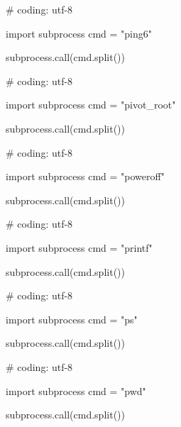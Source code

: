 \begin{mylisting}[label={lst:acpid},language=sh,caption=ping6]

# coding: utf-8

import subprocess
cmd = "ping6"

subprocess.call(cmd.split())

\end{mylisting}

\begin{mylisting}[label={lst:acpid},language=sh,caption=pivot_root]

# coding: utf-8

import subprocess
cmd = "pivot_root"

subprocess.call(cmd.split())

\end{mylisting}

\begin{mylisting}[label={lst:acpid},language=sh,caption=poweroff]

# coding: utf-8

import subprocess
cmd = "poweroff"

subprocess.call(cmd.split())

\end{mylisting}

\begin{mylisting}[label={lst:acpid},language=sh,caption=printf]

# coding: utf-8

import subprocess
cmd = "printf"

subprocess.call(cmd.split())

\end{mylisting}

\begin{mylisting}[label={lst:acpid},language=sh,caption=ps]

# coding: utf-8

import subprocess
cmd = "ps"

subprocess.call(cmd.split())

\end{mylisting}

\begin{mylisting}[label={lst:acpid},language=sh,caption=pwd]

# coding: utf-8

import subprocess
cmd = "pwd"

subprocess.call(cmd.split())

\end{mylisting}

